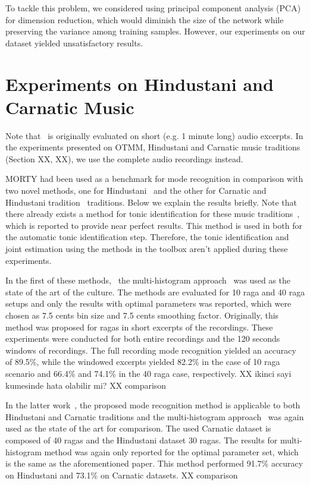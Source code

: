 \documentclass{sig-alternate}
\begin{document}
To tackle this problem, we considered using principal component analysis (PCA)~\cite{pca} for dimension reduction, which would diminish the size of the network while preserving the variance among training samples. However, our experiments on our dataset yielded unsatisfactory results. 

\section{Experiments on Hindustani and Carnatic Music}
\label{sec:hindustani_carnatic}
Note that~\cite{chordia} is originally evaluated on short  (e.g. 1 minute long) audio excerpts. In the experiments presented on OTMM, Hindustani and Carnatic music traditions (Section XX, XX), we use the complete audio recordings instead.

MORTY had been used as a benchmark for mode recognition in comparison with two novel methods, one for Hindustani~\cite{hindustani_carnatic_experiments_anon} and the other for Carnatic and Hindustani tradition~\cite{hindustani_carnatic_experiments_anon, carnatic_experiments_anon} traditions. Below we explain the results briefly. Note that there already exists a method for tonic identification for these music traditions~\cite{sankalp_tonic}, which is reported to provide near perfect results. This method is used in both for the automatic tonic identification step. Therefore, the tonic identification and joint estimation using the methods in the toolbox aren't applied during these experiments.

In the first of these methods,~\cite{carnatic_experiments_anon} the multi-histogram approach~\cite{chordia} was used as the state of the art of the culture. The methods are evaluated for 10 raga and 40 raga setups and only the results with optimal parameters was reported, which were chosen as 7.5 cents bin size and 7.5 cents smoothing factor. Originally, this method was proposed for ragas in short excerpts of the recordings. These experiments were conducted for both entire recordings and the 120 seconds windows of recordings. The full recording mode recognition yielded an accuracy of 89.5\%, while the windowed excerpts yielded 82.2\% in the case of 10 raga scenario and 66.4\% and 74.1\% in the 40 raga case, respectively. XX ikinci sayi kumesinde hata olabilir mi? XX comparison

In the latter work~\cite{hindustani_carnatic_experiments_anon}, the proposed mode recognition method is applicable to both Hindustani and Carnatic traditions and the multi-histogram approach~\cite{chordia} was again used as the state of the art for comparison. The used Carnatic dataset is composed of 40 ragas and the Hindustani dataset 30 ragas. The results for multi-histogram method was again only reported for the optimal parameter set, which is the same as the aforementioned paper. This method performed 91.7\% accuracy on Hindustani and 73.1\% on Carnatic datasets. XX comparison
\end{document}
